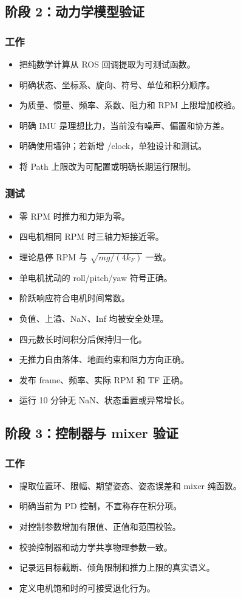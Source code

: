 \documentclass[UTF8,a4paper,12pt,fontset=fandol]{ctexart}
\newcommand{\unchecked}{\(\square\)}
\newcommand{\workitem}[1]{\item[\unchecked] #1}
\begin{document}
\subsection{阶段 2：动力学模型验证}

\subsubsection{工作}
\begin{itemize}
  \workitem{把纯数学计算从 ROS 回调提取为可测试函数。}
  \workitem{明确状态、坐标系、旋向、符号、单位和积分顺序。}
  \workitem{为质量、惯量、频率、系数、阻力和 RPM 上限增加校验。}
  \workitem{明确 IMU 是理想比力，当前没有噪声、偏置和协方差。}
  \workitem{明确使用墙钟；若新增 /clock，单独设计和测试。}
  \workitem{将 Path 上限改为可配置或明确长期运行限制。}
\end{itemize}

\subsubsection{测试}
\begin{itemize}
  \workitem{零 RPM 时推力和力矩为零。}
  \workitem{四电机相同 RPM 时三轴力矩接近零。}
  \workitem{理论悬停 RPM 与 \(\sqrt{mg/(4k_F)}\) 一致。}
  \workitem{单电机扰动的 roll/pitch/yaw 符号正确。}
  \workitem{阶跃响应符合电机时间常数。}
  \workitem{负值、上溢、NaN、Inf 均被安全处理。}
  \workitem{四元数长时间积分后保持归一化。}
  \workitem{无推力自由落体、地面约束和阻力方向正确。}
  \workitem{发布 frame、频率、实际 RPM 和 TF 正确。}
  \workitem{运行 10 分钟无 NaN、状态重置或异常增长。}
\end{itemize}

\subsection{阶段 3：控制器与 mixer 验证}

\subsubsection{工作}
\begin{itemize}
  \workitem{提取位置环、限幅、期望姿态、姿态误差和 mixer 纯函数。}
  \workitem{明确当前为 PD 控制，不宣称存在积分项。}
  \workitem{对控制参数增加有限值、正值和范围校验。}
  \workitem{校验控制器和动力学共享物理参数一致。}
  \workitem{记录远目标截断、倾角限制和推力上限的真实语义。}
  \workitem{定义电机饱和时的可接受退化行为。}
\end{itemize}
\end{document}
